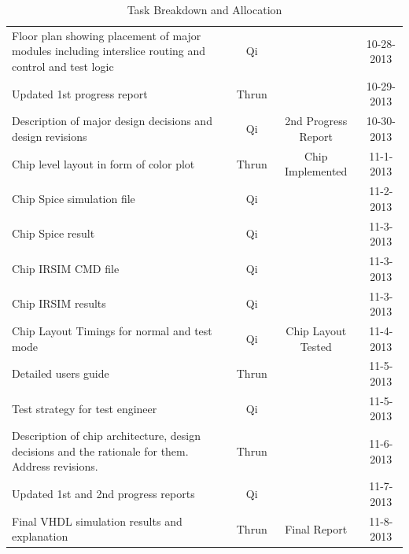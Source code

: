 \documentclass{article}
\begin{document}
\begin{table}[H]
\begin{tabular}{p{}ccc}
        Floor plan showing placement of major modules including interslice routing and control and test logic & Qi    &                               & 10-28-2013 \\
        Updated 1st progress report                                                                           & Thrun &                               & 10-29-2013 \\
        Description of major design decisions and design revisions                                            & Qi    & 2nd Progress Report           & 10-30-2013 \\
        \hline
        Chip level layout in form of color plot                                                               & Thrun & Chip Implemented              & 11-1-2013 \\
        Chip Spice simulation file                                                                            & Qi    &                               & 11-2-2013 \\
        Chip Spice result                                                                                     & Qi    &                               & 11-3-2013 \\
        Chip IRSIM CMD file                                                                                   & Qi    &                               & 11-3-2013 \\
        Chip IRSIM results                                                                                    & Qi    &                               & 11-3-2013 \\
        Chip Layout Timings for normal and test mode                                                          & Qi    & Chip Layout Tested            & 11-4-2013 \\
        Detailed users guide                                                                                  & Thrun &                               & 11-5-2013 \\
        Test strategy for test engineer                                                                       & Qi    &                               & 11-5-2013 \\
        Description of chip architecture, design decisions and the rationale for them. Address revisions.     & Thrun &                               & 11-6-2013 \\
        Updated 1st and 2nd progress reports                                                                  & Qi    &                               & 11-7-2013 \\
        Final VHDL simulation results and explanation                                                         & Thrun & Final Report                  & 11-8-2013 \\
        \bottomrule
    \end{tabular}
    \caption{Task Breakdown and Allocation}
\end{table}
\end{document}

